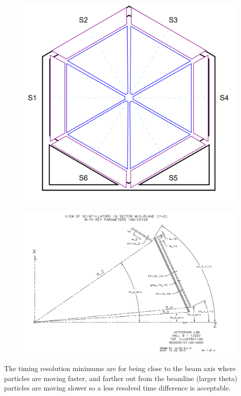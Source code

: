             									
			 \begin{figure}[H]
    			\centering
    			\includegraphics[width=12cm]{Chapters/Ch2-Experiment/clas-12-exp/clas-detectors/fd/pics/ftof-front.png}
			\end{figure}

		
			 \begin{figure}[H]
    			\centering
    			\includegraphics[width=12cm]{Chapters/Ch2-Experiment/clas-12-exp/clas-detectors/fd/pics/clas12-ftof-geom.png}
			\end{figure}
			
			
            
            The timing resolution minimums are for being close to the beam axis where particles are moving faster, and farther out from the beamline (larger theta) particles are moving slower so a less resolved time difference is acceptable. 
            

